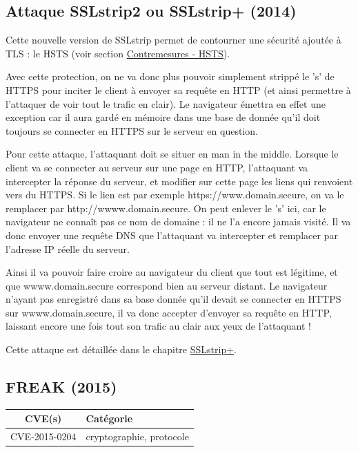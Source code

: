 \subsection{Attaque SSLstrip2 ou SSLstrip+ (2014)}

Cette nouvelle version de SSLstrip permet de contourner une sécurité ajoutée à TLS : le HSTS (voir section \hyperref[sec:hsts]{Contremesures - HSTS}).

Avec cette protection, on ne va donc plus pouvoir simplement strippé le 's' de HTTPS pour inciter le client à envoyer sa requête en HTTP (et ainsi permettre à l'attaquer de voir tout le trafic en clair). Le navigateur émettra en effet une exception car il aura gardé en mémoire dans une base de donnée qu'il doit toujours se connecter en HTTPS sur le serveur en question.

Pour cette attaque, l'attaquant doit se situer en man in the middle. Lorsque le client va se connecter au serveur sur une page en HTTP, l'attaquant va intercepter la réponse du serveur, et modifier sur cette page les liens qui renvoient vers du HTTPS. Si le lien est par exemple https://www.domain.secure, on va le remplacer par http://wwww.domain.secure. On peut enlever le 's' ici, car le navigateur ne connaît pas ce nom de domaine : il ne l'a encore jamais visité. Il va donc envoyer une requête DNS que l'attaquant va intercepter et remplacer par l'adresse IP réelle du serveur.

Ainsi il va pouvoir faire croire au navigateur du client que tout est légitime, et que wwww.domain.secure correspond bien au serveur distant. Le navigateur n'ayant pas enregistré dans sa base donnée qu'il devait se connecter en HTTPS sur wwww.domain.secure, il va donc accepter d'envoyer sa requête en HTTP, laissant encore une fois tout son trafic au clair aux yeux de l'attaquant !

Cette attaque est détaillée dans le chapitre \hyperref[sec:sslstrip2]{SSLstrip+}.



\subsection{FREAK (2015)}

\begin{tabularx}{0.96\textwidth}{|c|X|}
  \hline
  \textbf{CVE(s)} & \textbf{Catégorie} \\
  \hline
  CVE-2015-0204 & cryptographie, protocole \\
  \hline
\end{tabularx}


